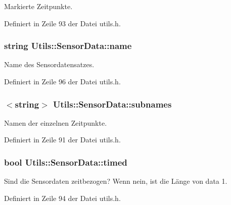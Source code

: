Markierte Zeitpunkte. 



Definiert in Zeile 93 der Datei utils.\-h.

\hypertarget{structUtils_1_1SensorData_a52474d0fe0dce0d3ee73c007a150a507}{
\subsubsection[{name}]{\setlength{\rightskip}{0pt plus 5cm}string Utils\-::\-Sensor\-Data\-::name}}\label{structUtils_1_1SensorData_a52474d0fe0dce0d3ee73c007a150a507}


Name des Sensordatensatzes. 



Definiert in Zeile 96 der Datei utils.\-h.

\hypertarget{structUtils_1_1SensorData_ad5875ab7e8ebdc9dc41a7b9ef1c063ba}{
\subsubsection[{subnames}]{$<$string$>$ Utils\-::\-Sensor\-Data\-::subnames}}\label{structUtils_1_1SensorData_ad5875ab7e8ebdc9dc41a7b9ef1c063ba}


Namen der einzelnen Zeitpunkte. 



Definiert in Zeile 91 der Datei utils.\-h.

\hypertarget{structUtils_1_1SensorData_aca94c3ec7e8f2e719f7cfcff4e9da41b}{
\subsubsection[{timed}]{\setlength{\rightskip}{0pt plus 5cm}bool Utils\-::\-Sensor\-Data\-::timed}}\label{structUtils_1_1SensorData_aca94c3ec7e8f2e719f7cfcff4e9da41b}


Sind die Sensordaten zeitbezogen? Wenn nein, ist die Länge von data 1. 



Definiert in Zeile 94 der Datei utils.\-h.

